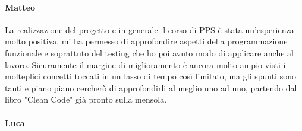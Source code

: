 \paragraph{Matteo}
La realizzazione del progetto e in generale il corso di PPS è stata un'esperienza molto positiva, mi ha permesso di approfondire aspetti della programmazione funzionale e soprattuto del testing che ho poi avuto modo di applicare anche al lavoro.  
Sicuramente il margine di miglioramento è ancora molto ampio visti i molteplici concetti toccati in un lasso di tempo così limitato, ma gli spunti sono tanti e piano piano cercherò di approfondirli al meglio uno ad uno, partendo dal libro "Clean Code" già pronto sulla mensola.
\paragraph{Luca}